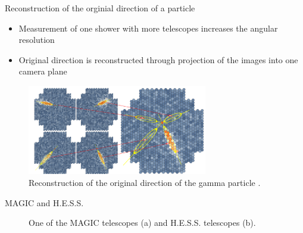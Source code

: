 \documentclass[aspectratio=1610, 10pt]{beamer}
\begin{document}
\begin{frame}{Reconstruction of the orginial direction of a particle}
  \begin{itemize}
    \item Measurement of one shower with more telescopes increases the angular resolution
    \medskip
    \item Original direction is reconstructed through projection of the images into one camera plane
  \end{itemize}
  \begin{figure}
    \includegraphics[width=0.7\textwidth]{images/reconstruction.png}
    \caption{Reconstruction of the original direction of the gamma particle \cite{iact}.}
  \end{figure}
\end{frame}

\begin{frame}{MAGIC and H.E.S.S.}
  \begin{figure}
      \hspace{0.5cm}
  \caption{One of the MAGIC telescopes (a) and H.E.S.S. telescopes (b).}
  \end{figure}
\end{frame}
\end{document}
